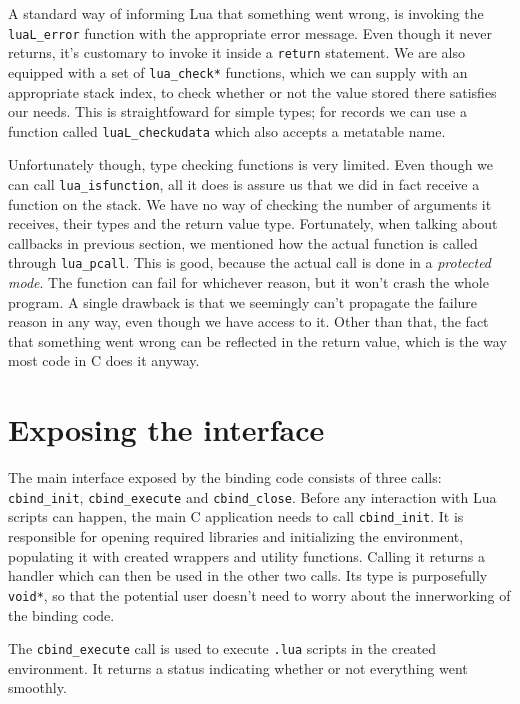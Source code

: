 \documentclass[polish, english]{iithesis}
\begin{document}
    A standard way of informing Lua that something went wrong, is invoking the \texttt{luaL\_error} function with the appropriate error message.
    Even though it never returns, it's customary to invoke it inside a \texttt{return} statement.
    We are also equipped with a set of \texttt{lua\_check*} functions, which we can supply with an appropriate stack index, to check whether or not the value stored there satisfies our needs.
    This is straightfoward for simple types; for records we can use a function called \texttt{luaL\_checkudata} which also accepts a metatable name.

    Unfortunately though, type checking functions is very limited.
    Even though we can call \texttt{lua\_isfunction}, all it does is assure us that we did in fact receive a function on the stack.
    We have no way of checking the number of arguments it receives, their types and the return value type.
    Fortunately, when talking about callbacks in previous section, we mentioned how the actual function is called through \texttt{lua\_pcall}.
    This is good, because the actual call is done in a \textit{protected mode}.
    The function can fail for whichever reason, but it won't crash the whole program.
    A single drawback is that we seemingly can't propagate the failure reason in any way, even though we have access to it.
    Other than that, the fact that something went wrong can be reflected in the return value, which is the way most code in C does it anyway.

  \section{Exposing the interface}
    The main interface exposed by the binding code consists of three calls: \texttt{cbind\_init}, \texttt{cbind\_execute} and \texttt{cbind\_close}.
    Before any interaction with Lua scripts can happen, the main C application needs to call \texttt{cbind\_init}.
    It is responsible for opening required libraries and initializing the environment, populating it with created wrappers and utility functions.
    Calling it returns a handler which can then be used in the other two calls.
    Its type is purposefully \texttt{void*}, so that the potential user doesn't need to worry about the innerworking of the binding code.

    The \texttt{cbind\_execute} call is used to execute \texttt{.lua} scripts in the created environment.
    It returns a status indicating whether or not everything went smoothly.
\end{document}
